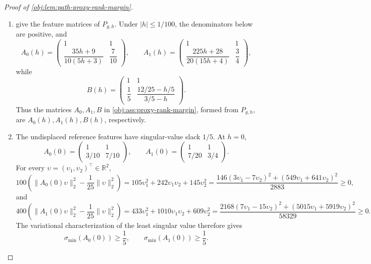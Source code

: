 \begin{proof}[Proof of \cref{obj:lem:path-proxy-rank-margin}]
\begin{enumerate}
\item {} give the feature matrices of \(P_{g,h}\). Under \(|h|\le 1/100\), the denominators below are positive, and
\[
A_0(h)=
\begin{pmatrix}
1&1\\[0.2em]
\dfrac{35h+9}{10(5h+3)}&\dfrac{7}{10}
\end{pmatrix},
\qquad
A_1(h)=
\begin{pmatrix}
1&1\\[0.2em]
\dfrac{225h+28}{20(15h+4)}&\dfrac{3}{4}
\end{pmatrix},
\]
while
\[
B(h)=
\begin{pmatrix}
1&1\\[0.2em]
\dfrac15&\dfrac{12/25-h/5}{3/5-h}
\end{pmatrix}.
\]
Thus the matrices \(A_0,A_1,B\) in \cref{obj:ass:proxy-rank-margin}, formed from \(P_{g,h}\), are \(A_0(h),A_1(h),B(h)\), respectively. %

\item The undisplaced reference features have singular-value slack \(1/5\). At \(h=0\),
\[
A_0(0)=
\begin{pmatrix}1&1\\[0.2em]3/10&7/10\end{pmatrix},
\qquad
A_1(0)=
\begin{pmatrix}1&1\\[0.2em]7/20&3/4\end{pmatrix}.
\]
For every \(\upsilon=(\upsilon_1,\upsilon_2)^\top\in\mathbb R^2\),
\[
100\left(\|A_0(0)\upsilon\|_2^2-\frac1{25}\|\upsilon\|_2^2\right)
=
105\upsilon_1^2+242\upsilon_1\upsilon_2+145\upsilon_2^2
=
\frac{146(3\upsilon_1-7\upsilon_2)^2+(549\upsilon_1+641\upsilon_2)^2}{2883}\ge0,
\]
and
\[
400\left(\|A_1(0)\upsilon\|_2^2-\frac1{25}\|\upsilon\|_2^2\right)
=
433\upsilon_1^2+1010\upsilon_1\upsilon_2+609\upsilon_2^2
=
\frac{2168(7\upsilon_1-15\upsilon_2)^2+(5015\upsilon_1+5919\upsilon_2)^2}{58329}\ge0.
\]
The variational characterization of the least singular value therefore gives
\[
\sigma_{\min}(A_0(0))\ge\frac15,
\qquad
\sigma_{\min}(A_1(0))\ge\frac15 .
\] %


\end{enumerate}
\end{proof}
